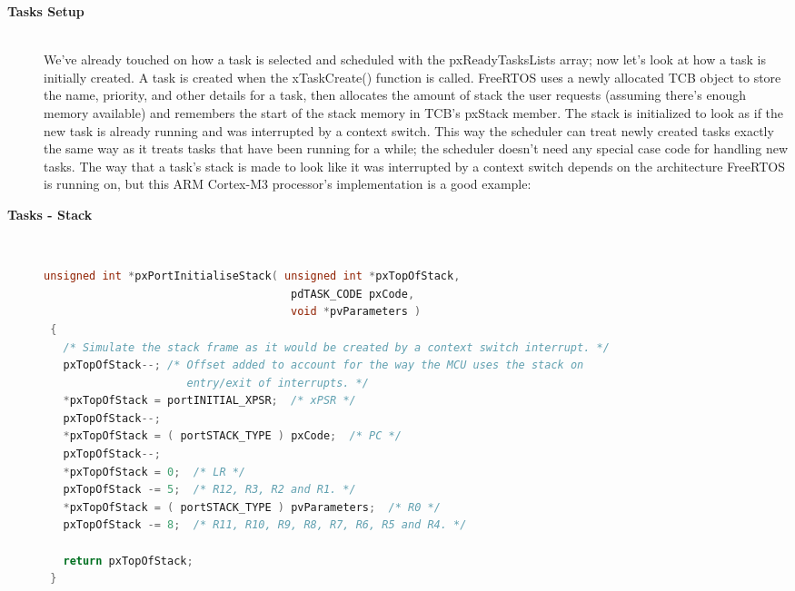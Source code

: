 \begin{description}
\os{\newpage}



\item[{\rot\bf Tasks  Setup}]~\\[-3ex]
\bi
\ite We've already touched on how a task is selected and scheduled with the pxReadyTasksLists array; now let's look at how a task is initially created. A task is created when the xTaskCreate() function is called. FreeRTOS uses a newly allocated TCB object to store the name, priority, and other details for a task, then allocates the amount of stack the user requests (assuming there's enough memory available) and remembers the start of the stack memory in TCB's pxStack member.
\ite
\ite The stack is initialized to look as if the new task is already running and was interrupted by a context switch. This way the scheduler can treat newly created tasks exactly the same way as it treats tasks that have been running for a while; the scheduler doesn't need any special case code for handling new tasks.
\ite
\ite The way that a task's stack is made to look like it was interrupted by a context switch depends on the architecture FreeRTOS is running on, but this ARM Cortex-M3 processor's implementation is a good example:
\ei

\os{\newpage}



\item[{\rot\bf Tasks - Stack}]~\\[-3ex]
\begin{lstlisting}[language=C]
 unsigned int *pxPortInitialiseStack( unsigned int *pxTopOfStack,
                                      pdTASK_CODE pxCode,
                                      void *pvParameters )
 {
   /* Simulate the stack frame as it would be created by a context switch interrupt. */
   pxTopOfStack--; /* Offset added to account for the way the MCU uses the stack on
                      entry/exit of interrupts. */
   *pxTopOfStack = portINITIAL_XPSR;  /* xPSR */
   pxTopOfStack--;
   *pxTopOfStack = ( portSTACK_TYPE ) pxCode;  /* PC */
   pxTopOfStack--;
   *pxTopOfStack = 0;  /* LR */
   pxTopOfStack -= 5;  /* R12, R3, R2 and R1. */
   *pxTopOfStack = ( portSTACK_TYPE ) pvParameters;  /* R0 */
   pxTopOfStack -= 8;  /* R11, R10, R9, R8, R7, R6, R5 and R4. */

   return pxTopOfStack;
 }
\end{lstlisting}

\os{\newpage}




\end{description}
